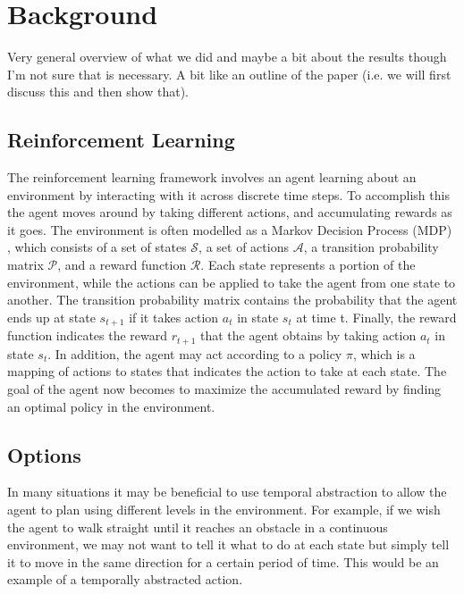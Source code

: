 \documentclass{acm_proc_article-sp}
\begin{document}
\section{Background} %

Very general overview of what we did and maybe a bit about the results though I'm not sure that is necessary. A bit like an outline of the paper (i.e. we will first discuss this and then show that).

\subsection{Reinforcement Learning}


The reinforcement learning framework involves an agent learning about an environment by interacting with it across discrete time steps. To accomplish this the agent moves around by taking different actions, and accumulating rewards as it goes.
	 The environment is often modelled as a Markov Decision Process (MDP) \cite{Puterman}, which consists of a set of states $\mathcal{S}$, a set of actions $\mathcal{A}$, a transition probability matrix $\mathcal{P}$, and a reward function $\mathcal{R}$. Each state represents a portion of the environment, while the actions can be applied to take the agent from one state to another. 
	 The transition probability matrix contains the probability that the agent ends up at state $s_{t+1}$ if it takes action $a_t$ in state $s_t$ at time t. Finally, the reward function indicates the reward $r_{t+1}$ that the agent obtains by taking action $a_t$ in state $s_t$. In addition, the agent may act according to a policy $\pi$, which is a mapping of actions to states that indicates the action to take at each state. The goal of the agent now becomes to maximize the accumulated reward by finding an optimal policy in the environment.  
	 
\subsection{Options}


In many situations it may be beneficial to use temporal abstraction to allow the agent to plan using different levels in the environment. For example, if we wish the agent to walk straight until it reaches an obstacle in a continuous environment, we may not want to tell it what to do at each state but simply tell it to move in the same direction for a certain period of time. This would be an example of a temporally abstracted action.
\end{document}
